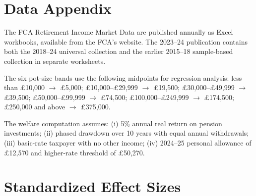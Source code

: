 \documentclass[12pt]{article}
\begin{document}
\label{apep_main_text_end}
\newpage


\newpage
\appendix

\section{Data Appendix}

The FCA Retirement Income Market Data are published annually as Excel workbooks, available from the FCA's website. The 2023--24 publication contains both the 2018--24 universal collection and the earlier 2015--18 sample-based collection in separate worksheets.

The six pot-size bands use the following midpoints for regression analysis: less than \pounds10,000 $\to$ \pounds5,000; \pounds10,000--\pounds29,999 $\to$ \pounds19,500; \pounds30,000--\pounds49,999 $\to$ \pounds39,500; \pounds50,000--\pounds99,999 $\to$ \pounds74,500; \pounds100,000--\pounds249,999 $\to$ \pounds174,500; \pounds250,000 and above $\to$ \pounds375,000.

The welfare computation assumes: (i) 5\% annual real return on pension investments; (ii) phased drawdown over 10 years with equal annual withdrawals; (iii) basic-rate taxpayer with no other income; (iv) 2024--25 personal allowance of \pounds12,570 and higher-rate threshold of \pounds50,270.

\section{Standardized Effect Sizes}
\label{sec:sde}


\end{document}
